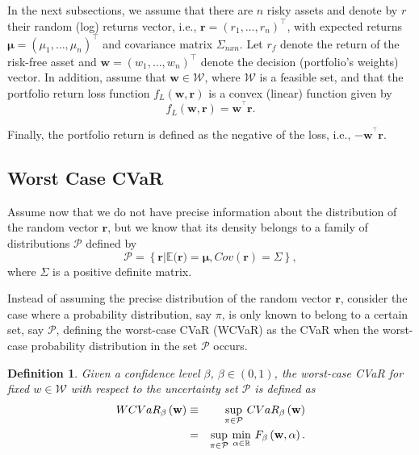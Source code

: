 \documentclass[a4paper,10pt]{article}
\newtheorem{mydef}{Definition}
\begin{document}
In the next subsections, we assume that there are $n$ risky assets and denote by $r$ their random (log) returns vector, i.e., $\mathbf{r}\mathbf{=}\left(r_{1},\ldots,r_{n}\right)^{\top }$, with expected returns $\mathbf{\mu }\mathbf{=}\left( \mu _{1},\ldots,\mu _{n}\right) ^{\top }$ and covariance matrix $\Sigma_{nxn}$. Let $r_{f}$ denote the return of the risk-free asset and $\mathbf{w}\mathbf{=}\left( w_{1},\ldots,w_{n}\right) ^{\top }$ denote the decision (portfolio's weights) vector. In addition, assume that $\mathbf{w}\in \mathcal{W}$, where $\mathcal{W}$ is a feasible set, and that the portfolio return loss function $f_{L}\left( \mathbf{w,r}\right) $ is a convex (linear) function given by
\begin{equation*}
f_{L}(\mathbf{w},\mathbf{r})=\mathbf{w}^{^{\top }}\mathbf{r}.
\end{equation*}

Finally, the portfolio return is defined as the negative of the loss, i.e., $-\mathbf{w}^{^{\top }}\mathbf{r}$.

\subsection{Worst Case CVaR}

 Assume now that we do not have precise information about the distribution of the random vector $\mathbf{r}$, but we know that its density belongs to a family of distributions $\mathcal{P}$ defined by
\begin{equation}
\mathcal{P=}\left\{ \mathbf{r}\left\vert \mathbb{E(}\mathbf{r})=\mathbf{\mu },Cov(\mathbf{r})=\Sigma \right. \right\},  \label{13b}
\end{equation}
where $\Sigma$ is a positive definite matrix.

Instead of assuming the precise distribution of the random vector $\mathbf{r}$, \citet*{zhu2009worst} consider the case where a probability distribution, say $\pi$, is only known to belong to a certain set, say $\mathcal{P}$, defining the worst-case CVaR (WCVaR) as the CVaR when the worst-case probability distribution in the set $\mathcal{P}$ occurs.

\begin{mydef}
	Given a confidence level $\beta$, $\beta \in (0,1)$, the worst-case CVaR for fixed $w\in \mathcal{W}$ with respect to the uncertainty set $\mathcal{P}$ is defined as
	\begin{eqnarray}
	WCVaR_{\beta }\left( \mathbf{w}\right) &\equiv &\underset{\pi \in \mathcal{P}}{\sup }~ CVaR_{\beta }\left( \mathbf{w}\right)  \notag \\
	&=&\underset{\pi \in \mathcal{P}}{\sup }~\underset{\alpha \in
		\mathbb{R}}{\min }~F_{\beta }\left(\mathbf{w},\alpha \right).  \label{14}
	\end{eqnarray}
\end{mydef}
\end{document}
